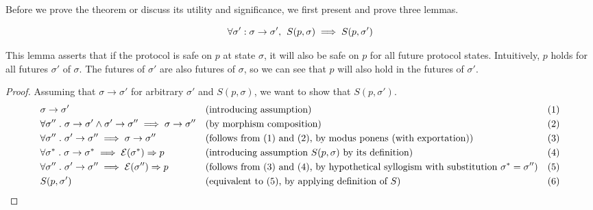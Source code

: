 \documentclass{article}
\theoremstyle{definition}
\begin{document}
Before we prove the theorem or discuss its utility and significance, we first present and prove three lemmas.

\vspace{5mm}

\begin{lemma}
$$
\forall \sigma':\sigma \to \sigma',\hspace{1.5mm} S(p,\sigma) \implies S(p,\sigma')
$$
\end{lemma}

This lemma asserts that if the protocol is safe on $p$ at state $\sigma$, it will also be safe on $p$ for all future protocol states. Intuitively, $p$ holds for all futures $\sigma'$ of $\sigma$. The futures of $\sigma'$ are also futures of $\sigma$, so we can see that $p$ will also hold in the futures of $\sigma'$.

\begin{proof}
Assuming that $\sigma \to \sigma'$ for arbitrary $\sigma'$ and $S(p, \sigma)$, we want to show that $S(p, \sigma')$.
  \begin{align*}
    &\sigma \to \sigma' &&\text{(introducing assumption)}   &&\text{(1)}\\ 
    &\forall \sigma'' \hspace{1mm}.\hspace{1mm}\sigma \to \sigma' \land \sigma' \to \sigma'' \implies \sigma \to \sigma'' &&\text{(by morphism composition)}   &&\text{(2)}\\
    &\forall \sigma'' \hspace{1mm}.\hspace{1mm}\sigma' \to \sigma'' \implies \sigma \to \sigma'' &&\text{(follows from (1) and (2), by modus ponens (with exportation))}   &&\text{(3)}\\
    &\forall \sigma^* \hspace{1mm}.\hspace{1mm}\sigma \to \sigma^* \implies \mathcal{E}(\sigma^*) \Rightarrow p &&\text{(introducing assumption $S(p, \sigma)$ by its definition) }   &&\text{(4)} \\
    &\forall \sigma'' \hspace{1mm}.\hspace{1mm}\sigma' \to \sigma'' \implies \mathcal{E}(\sigma'') \Rightarrow p &&\text{(follows from (3) and (4), by hypothetical syllogism with substitution $\sigma^* = \sigma''$)}   &&\text{(5)}\\
    &S(p, \sigma')  \hspace{5mm} \qedhere &&\text{(equivalent to (5), by applying definition of $S$) }   &&\text{(6)}
  \end{align*}
\end{proof}
\end{document}
